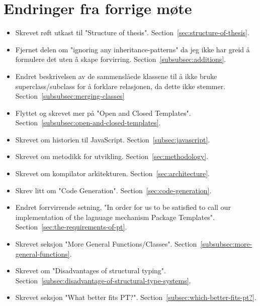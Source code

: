 
\chapter*{Endringer fra forrige møte}

\begin{itemize}
    \item Skrevet røft utkast til "Structure of thesis".
    Section~\vref{sec:structure-of-thesis}.
    \item Fjernet delen om "ignoring any inheritance-patterns" da jeg ikke har greid å formulere det uten å skape forvirring.
    Section~\vref{subsubsec:additions}.
    \item Endret beskrivelsen av de sammenslåede klassene til å ikke bruke superclass/subclass for å forklare relasjonen, da dette ikke stemmer.
    Section~\vref{subsubsec:merging-classes}
    \item Flyttet og skrevet mer på "Open and Closed Templates".
    Section~\vref{subsubsec:open-and-closed-templates}.
    \item Skrevet om historien til JavaScript.
    Section~\vref{subsec:javascript}.
    \item Skrevet om metodikk for utvikling.
    Section~\vref{sec:methodology}.
    \item Skrevet om kompilator arkitekturen.
    Section~\vref{sec:architecture}.
    \item Skrev litt om "Code Generation".
    Section~\vref{sec:code-generation}.
    \item Endret forrvirrende setning, "In order for us to be satisfied to call our implementation of the lagnuage mechanism Package Templates".
    Section~\vref{sec:the-requirements-of-pt}.
    \item Skrevet seksjon "More General Functions/Classes".
    Section~\vref{subsubsec:more-general-functions}.
    \item Skrevet om "Disadvantages of structural typing".
    Section~\vref{subsec:disadvantage-of-structural-type-systems}.
    \item Skrevet seksjon "What better fits PT?".
    Section~\vref{subsec:which-better-fits-pt?}.
\end{itemize}

